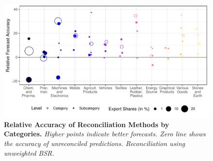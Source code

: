 \documentclass[a4paper,fleqn,11pt]{article}
\begin{document}
\begin{figure}[H]
	\includegraphics[width=\textwidth]{fig/fig_eval_categories}
	\caption[Relative Accuracy of Reconciliation Methods by Categories]{\textbf{Relative Accuracy of Reconciliation Methods by Categories.} \textit{Higher points indicate better forecasts. Zero line shows the accuracy of unreconciled predictions. Reconciliation using unweighted BSR.}}\label{fig:eval_categories}
\end{figure}

\ \\
\end{document}
